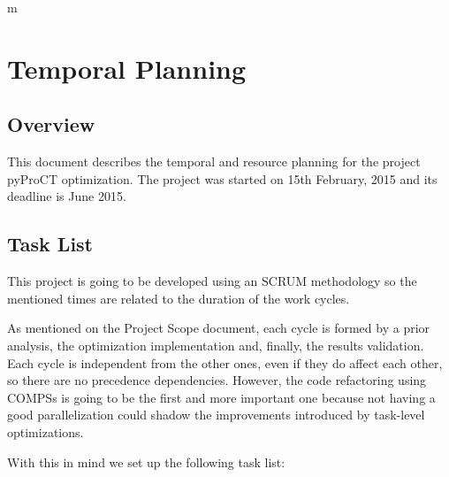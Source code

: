 m
  
\chapter{Temporal Planning}
\label{sec:temporal_planning}

\section{Overview}

This document describes the temporal and resource planning for the project pyProCT optimization. The project was started on 15th February, 2015 and its deadline is June 2015.

\section{Task List}

This project is going to be developed using an SCRUM methodology so the mentioned times are related to the duration of the work cycles. 

As mentioned on the Project Scope document, each cycle is formed by a prior analysis, the optimization implementation and, finally, the results validation. Each cycle is independent from the other ones, even if they do affect each other, so there are no precedence dependencies. However, the code refactoring using COMPSs is going to be the first and more important one because not having a good parallelization could shadow the improvements introduced by task-level optimizations. 

With this in mind we set up the following task list:

